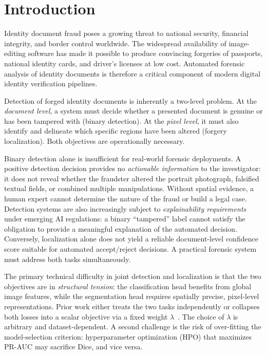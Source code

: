 
\section{Introduction}
\label{sec:intro}

Identity document fraud poses a growing threat to national security, financial
integrity, and border control worldwide. The widespread availability of
image-editing software has made it possible to produce convincing forgeries of
passports, national identity cards, and driver's licenses at low cost.
Automated forensic analysis of identity documents
is therefore a critical component of modern digital identity verification
pipelines.

Detection of forged identity documents is inherently a two-level problem. At the
\emph{document level}, a system must decide whether a presented document is
genuine or has been tampered with (binary detection). At the \emph{pixel level},
it must also identify and delineate which specific regions have been altered
(forgery localization). Both objectives are operationally necessary.

Binary detection alone is insufficient for real-world forensic deployments.
A positive detection decision provides no \emph{actionable information} to the
investigator: it does not reveal whether the fraudster altered the portrait
photograph, falsified textual fields, or combined multiple manipulations. Without
spatial evidence, a human expert cannot determine the nature of the fraud or
build a legal case. Detection systems are also increasingly subject to
\emph{explainability requirements} under emerging AI regulations: a binary
``tampered'' label cannot satisfy the obligation
to provide a meaningful explanation of the automated decision. Conversely,
localization alone does not yield a reliable document-level confidence score
suitable for automated accept/reject decisions. A practical forensic system must
address both tasks simultaneously.

The primary technical difficulty in joint detection and localization is that the
two objectives are in \emph{structural tension}: the classification head
benefits from global image features, while the segmentation head requires
spatially precise, pixel-level representations. Prior work either treats the
two tasks independently \citep{trufor2023} or collapses both losses into a
scalar objective via a fixed weight $\lambda$~\citep{kendall2018multi}. The choice of $\lambda$ is arbitrary and dataset-dependent.
A second challenge is the risk of over-fitting the model-selection criterion:
hyperparameter optimization (HPO) that maximizes PR-AUC may sacrifice Dice, and vice versa.

